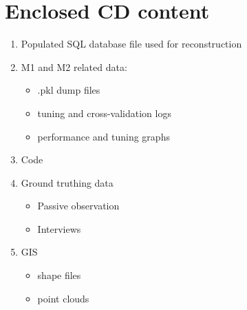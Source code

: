 \chapter*{Enclosed CD content} \label{CD_content}

\begin{enumerate}
    \item Populated SQL database file used for reconstruction
    \item M1 and M2 related data:
    \begin{itemize}
        \item .pkl dump files
        \item tuning and cross-validation logs
        \item performance and tuning graphs
    \end{itemize}
    \item Code
    \item Ground truthing data
    \begin{itemize}
        \item Passive observation
        \item Interviews
    \end{itemize}
    \item GIS
    \begin{itemize}
        \item shape files
        \item point clouds
    \end{itemize}
\end{enumerate}